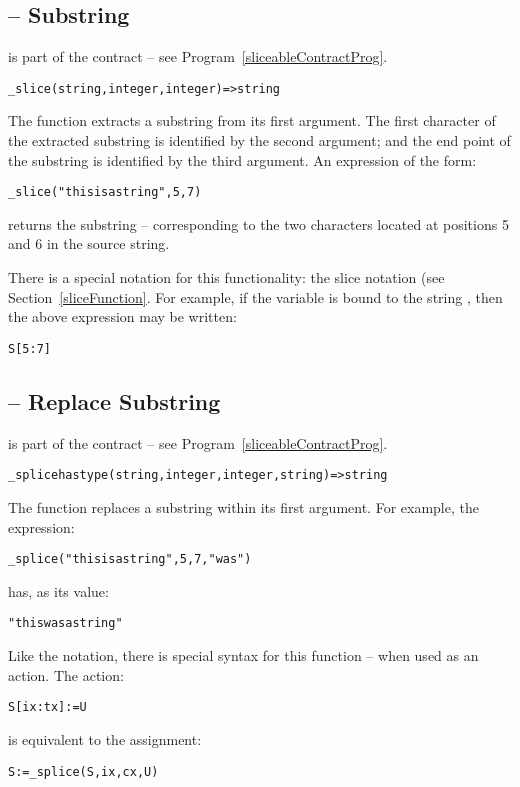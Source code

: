 \subsection{ -- Substring}
\label{sliceString}
 is part of the  contract -- see Program~\vref{sliceableContractProg}.
\begin{alltt}
\_slice(string,integer,integer)=>string
\end{alltt}
The  function extracts a substring from its first argument. The first character of the extracted substring is identified by the second argument; and the end point of the substring is identified by the third argument. An expression of the form:
\begin{alltt}
\_slice("this is a string",5,7)
\end{alltt}
returns the substring  -- corresponding to the two characters located at positions 5 and 6 in the source string.

There is a special notation for this functionality: the slice notation (see Section~\vref{sliceFunction}. For example, if the variable  is bound to the string , then the above expression may be written:
\begin{alltt}
S[5:7]
\end{alltt}

\subsection{ -- Replace Substring}
\label{spliceString}
 is part of the  contract -- see Program~\vref{sliceableContractProg}.
\begin{alltt}
\_splice has type (string,integer,integer,string) => string
\end{alltt}
The  function replaces a substring within its first argument. For example, the expression:
\begin{alltt}
\_splice("this is a string",5,7,"was")
\end{alltt}
has, as its value:
\begin{alltt}
"this was a string"
\end{alltt}

Like the  notation, there is special syntax for this function -- when used as an action. The action:
\begin{alltt}
S[ix:tx] := U
\end{alltt}
is equivalent to the assignment:
\begin{alltt}
S := \_splice(S,ix,cx,U)
\end{alltt}

